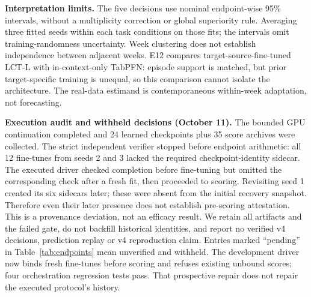 \textbf{Interpretation limits.} The five decisions use nominal endpoint-wise 95\% intervals, without a
multiplicity correction or global superiority rule. Averaging three fitted seeds within each task conditions on
those fits; the intervals omit training-randomness uncertainty. Week clustering does not establish independence
between adjacent weeks. E12 compares target-source-fine-tuned LCT-L with in-context-only TabPFN: episode support
is matched, but prior target-specific training is unequal, so this comparison cannot isolate the architecture.
The real-data estimand is contemporaneous within-week adaptation, not forecasting.

\textbf{Execution audit and withheld decisions (October 11).} The bounded GPU continuation completed and
24 learned checkpoints plus 35 score archives were collected. The strict independent verifier stopped before
endpoint arithmetic: all 12 fine-tunes from seeds 2 and 3 lacked the required checkpoint-identity sidecar.
The executed driver checked completion before fine-tuning but omitted the corresponding check after a fresh fit,
then proceeded to scoring. Revisiting seed 1 created its six sidecars later; these were absent from the initial
recovery snapshot. Therefore even their later presence does not establish pre-scoring attestation. This is a
provenance deviation, not an efficacy result. We retain all artifacts and the failed gate, do not backfill historical
identities, and report no verified v4 decisions, prediction replay or v4 reproduction claim. Entries marked
``pending'' in Table~\ref{tab:endpoints} mean unverified and withheld. The development driver now binds fresh
fine-tunes before scoring and refuses existing unbound scores; four orchestration regression tests pass. That
prospective repair does not repair the executed protocol's history.
